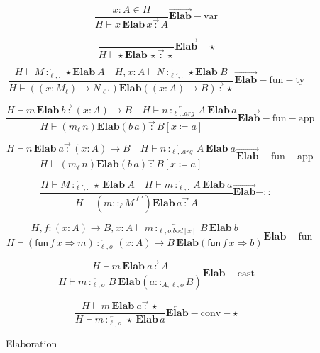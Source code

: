 \begin{figure}
\[
\frac{x:A\in H}{H\vdash x\,\textbf{Elab}\,x\overrightarrow{\,:\,}A}\operatorname{\overrightarrow{\textbf{Elab}}-var}
\]

\[
\frac{\,}{H\vdash\star\,\textbf{Elab}\,\star\overrightarrow{\,:\,}\star}\operatorname{\overrightarrow{\textbf{Elab}}-\star}
\]

\[
\frac{H\vdash M\overleftarrow{\,:_{\ell,.}\,}\star\textbf{Elab}\ A\quad H,x:A\vdash N\overleftarrow{\,:_{\ell',.}\,}\star\textbf{Elab}\ B}{H\vdash\left(\left(x:M_{\ensuremath{\ell}}\right)\rightarrow N_{\ensuremath{\ell'}}\right)\textbf{Elab}\left(\left(x:A\right)\rightarrow B\right)\overrightarrow{\,:\,}\star}\operatorname{\overrightarrow{\textbf{Elab}}-fun-ty}
\]

\[
\frac{H\vdash m\,\textbf{Elab}\ b\overrightarrow{\,:\,}\left(x:A\right)\rightarrow B\quad H\vdash n\overleftarrow{\,:_{\ell,.arg}\,}A\,\textbf{Elab}\,a}{H\vdash\left(m_{\ell}\,n\right)\textbf{Elab}\left(b\,a\right)\overrightarrow{\,:\,}B\left[x\coloneqq a\right]}\operatorname{\overrightarrow{\textbf{Elab}}-fun-app}
\]

\[
\frac{H\vdash n\,\textbf{Elab}\ a\overrightarrow{\,:\,}\left(x:A\right)\rightarrow B\quad H\vdash n\overleftarrow{\,:_{\ell,.arg}\,}A\,\textbf{Elab}\ a}{H\vdash\left(m_{\ell}\,n\right)\textbf{Elab}\left(b\,a\right)\overrightarrow{\,:\,}B\left[x\coloneqq a\right]}\operatorname{\overrightarrow{\textbf{Elab}}-fun-app}
\]

\[
\frac{H\vdash M\overleftarrow{\,:_{\ell',.}\,}\star\,\textbf{Elab}\ A\quad H\vdash m\overleftarrow{\,:_{\ell,.}\,}A\,\textbf{Elab}\ a}{H\vdash\left(m::_{\ell}M^{\ell'}\right)\textbf{Elab}\,a\overrightarrow{\,:\,}A}\operatorname{\overrightarrow{\textbf{Elab}}-::}
\]

\[
\frac{H,f:\left(x:A\right)\rightarrow B,x:A\vdash m\overleftarrow{\,:_{\ell,o.bod[x]}\,}B\,\textbf{Elab}\ b}{H\vdash\left(\mathsf{fun}\,f\,x\Rightarrow m\right)\overleftarrow{\,:_{\ell,o}\,}\left(x:A\right)\rightarrow B\,\textbf{Elab}\left(\mathsf{fun}\,f\,x\Rightarrow b\right)}\operatorname{\overleftarrow{\textbf{Elab}}-fun}
\]

\[
\frac{H\vdash m\,\textbf{Elab}\ a\overrightarrow{\,:\,}A}{H\vdash m\overleftarrow{\,:_{\ell,o}\,}B\ \textbf{Elab}\left(a::_{A,\ensuremath{\ell},o}B\right)}\operatorname{\overleftarrow{\textbf{Elab}}-cast}
\]

\[
\frac{H\vdash m\,\textbf{Elab}\ a\overrightarrow{\,:\,}\star}{H\vdash m\overleftarrow{\,:_{\ell,o}\,}\star\ \textbf{Elab}\,a}\operatorname{\overleftarrow{\textbf{Elab}}-conv-\star}
\]


\caption{Elaboration}
\label{fig:elaboration}
\end{figure}

